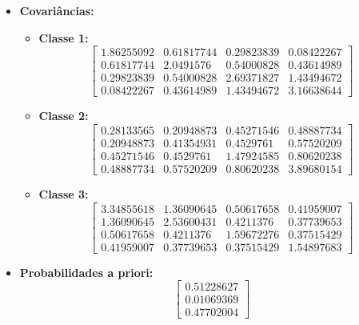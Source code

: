 \begin{enumerate}
\begin{tcolorbox}[title=Resposta:]
\begin{itemize}
            \item \textbf{Covariâncias:}
            \begin{itemize}
                \item \textbf{Classe 1:}
                \[
                \begin{bmatrix}
                1.86255092 & 0.61817744 & 0.29823839 & 0.08422267 \\
                0.61817744 & 2.0491576 & 0.54000828 & 0.43614989 \\
                0.29823839 & 0.54000828 & 2.69371827 & 1.43494672 \\
                0.08422267 & 0.43614989 & 1.43494672 & 3.16638644
                \end{bmatrix}
                \]
        
                \item \textbf{Classe 2:}
                \[
                \begin{bmatrix}
                0.28133565 & 0.20948873 & 0.45271546 & 0.48887734 \\
                0.20948873 & 0.41354931 & 0.4529761 & 0.57520209 \\
                0.45271546 & 0.4529761 & 1.47924585 & 0.80620238 \\
                0.48887734 & 0.57520209 & 0.80620238 & 3.89680154
                \end{bmatrix}
                \]
        
                \item \textbf{Classe 3:}
                \[
                \begin{bmatrix}
                3.34855618 & 1.36090645 & 0.50617658 & 0.41959007 \\
                1.36090645 & 2.53600431 & 0.4211376 & 0.37739653 \\
                0.50617658 & 0.4211376 & 1.59672276 & 0.37515429 \\
                0.41959007 & 0.37739653 & 0.37515429 & 1.54897683
                \end{bmatrix}
                \]
            \end{itemize}
        
            \item \textbf{Probabilidades a priori:}
            \[
            \begin{bmatrix}
            0.51228627 \\
            0.01069369 \\
            0.47702004
            \end{bmatrix}
            \]


\end{itemize}
\end{tcolorbox}
\end{enumerate}
